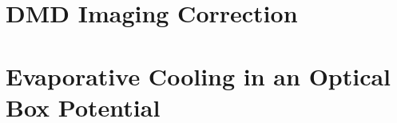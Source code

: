 \documentclass[]{cam-thesis}
\begin{document}
\frontmatter


\mainmatter
\pagestyle{headings}




\part{DMD Imaging Correction}















% 



\part{Evaporative Cooling in an Optical Box Potential}








% 
\end{document}
